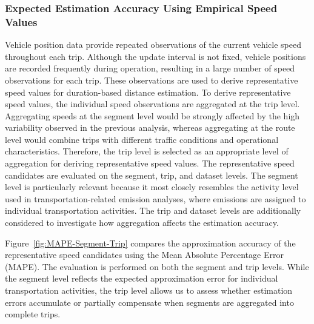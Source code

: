 \subsubsection{Expected Estimation Accuracy Using Empirical Speed Values}
Vehicle position data provide repeated observations of the current vehicle speed throughout each trip. Although the update interval is not fixed, vehicle positions are recorded frequently during operation, resulting in a large number of speed observations for each trip. These observations are used to derive representative speed values for duration-based distance estimation.
To derive representative speed values, the individual speed observations are aggregated at the trip level. Aggregating speeds at the segment level would be strongly affected by the high variability observed in the previous analysis, whereas aggregating at the route level would combine trips with different traffic conditions and operational characteristics. Therefore, the trip level is selected as an appropriate level of aggregation for deriving representative speed values. The representative speed candidates are evaluated on the segment, trip, and dataset levels. The segment level is particularly relevant because it most closely resembles the activity level used in transportation-related emission analyses, where emissions are assigned to individual transportation activities. The trip and dataset levels are additionally considered to investigate how aggregation affects the estimation accuracy.

Figure~\ref{fig:MAPE-Segment-Trip} compares the approximation accuracy of the representative speed candidates using the Mean Absolute Percentage Error (MAPE). The evaluation is performed on both the segment and trip levels. While the segment level reflects the expected approximation error for individual transportation activities, the trip level allows us to assess whether estimation errors accumulate or partially compensate when segments are aggregated into complete trips.

